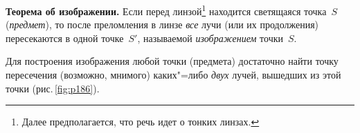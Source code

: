 \documentclass[main.tex]{subfiles}
\begin{document}


%
\begin{law}
    \textbf{Теорема об изображении.} Если перед линзой\footnote{Далее предполагается, что речь идет о тонких линзах.}  находится светящаяся точка~$S$ (\emph{предмет}), то после преломления в линзе \emph{все} лучи (или их продолжения) пересекаются в одной точке~$S'$, называемой \emph{изображением} точки~$S$.
\end{law}
%
Для построения изображения любой точки (предмета) достаточно найти точку пересечения (возможно, мнимого) каких"=либо \emph{двух} лучей, вышедших из этой точки (рис.\,\ref{fig:p186}).
\end{document}
